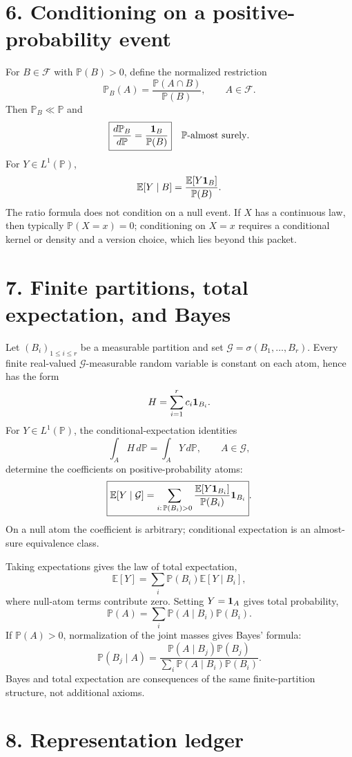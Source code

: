 \section*{6. Conditioning on a positive-probability event}

For $B\in\mathcal F$ with $\mathbb P(B)>0$, define the normalized restriction
\[
\mathbb P_B(A)
=
\frac{\mathbb P(A\cap B)}{\mathbb P(B)},
\qquad A\in\mathcal F.
\]
Then $\mathbb P_B\ll\mathbb P$ and
\[
\boxed{
\frac{d\mathbb P_B}{d\mathbb P}
=
\frac{\mathbf 1_B}{\mathbb P(B)}
}
\quad\mathbb P\text{-almost surely}.
\]
For $Y\in L^1(\mathbb P)$,
\[
\mathbb E[Y\mid B]
=
\frac{\mathbb E[Y\mathbf 1_B]}{\mathbb P(B)}.
\]
The ratio formula does not condition on a null event. If $X$ has a continuous law, then typically $\mathbb P(X=x)=0$; conditioning on $X=x$ requires a conditional kernel or density and a version choice, which lies beyond this packet.

\section*{7. Finite partitions, total expectation, and Bayes}

Let $(B_i)_{1\le i\le r}$ be a measurable partition and set $\mathcal G=\sigma(B_1,\ldots,B_r)$. Every finite real-valued $\mathcal G$-measurable random variable is constant on each atom, hence has the form
\[
H=\sum_{i=1}^rc_i\mathbf 1_{B_i}.
\]
For $Y\in L^1(\mathbb P)$, the conditional-expectation identities
\[
\int_AH\,d\mathbb P
=
\int_AY\,d\mathbb P,
\qquad A\in\mathcal G,
\]
determine the coefficients on positive-probability atoms:
\[
\boxed{
\mathbb E[Y\mid\mathcal G]
=
\sum_{i:\,\mathbb P(B_i)>0}
\frac{\mathbb E[Y\mathbf 1_{B_i}]}{\mathbb P(B_i)}\mathbf 1_{B_i}
}.
\]
On a null atom the coefficient is arbitrary; conditional expectation is an almost-sure equivalence class.

Taking expectations gives the law of total expectation,
\[
\mathbb E[Y]
=
\sum_i\mathbb P(B_i)\mathbb E[Y\mid B_i],
\]
where null-atom terms contribute zero. Setting $Y=\mathbf 1_A$ gives total probability,
\[
\mathbb P(A)
=
\sum_i\mathbb P(A\mid B_i)\mathbb P(B_i).
\]
If $\mathbb P(A)>0$, normalization of the joint masses gives Bayes' formula:
\[
\boxed{
\mathbb P(B_j\mid A)
=
\frac{\mathbb P(A\mid B_j)\mathbb P(B_j)}
{\sum_i\mathbb P(A\mid B_i)\mathbb P(B_i)}
}.
\]
Bayes and total expectation are consequences of the same finite-partition structure, not additional axioms.

\section*{8. Representation ledger}

